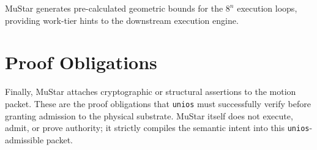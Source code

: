 MuStar generates pre-calculated geometric bounds for the $8^n$ execution loops, providing work-tier hints to the downstream execution engine.

\section{Proof Obligations}

Finally, MuStar attaches cryptographic or structural assertions to the motion packet. These are the proof obligations that \texttt{unios} must successfully verify before granting admission to the physical substrate. MuStar itself does not execute, admit, or prove authority; it strictly compiles the semantic intent into this \texttt{unios}-admissible packet.